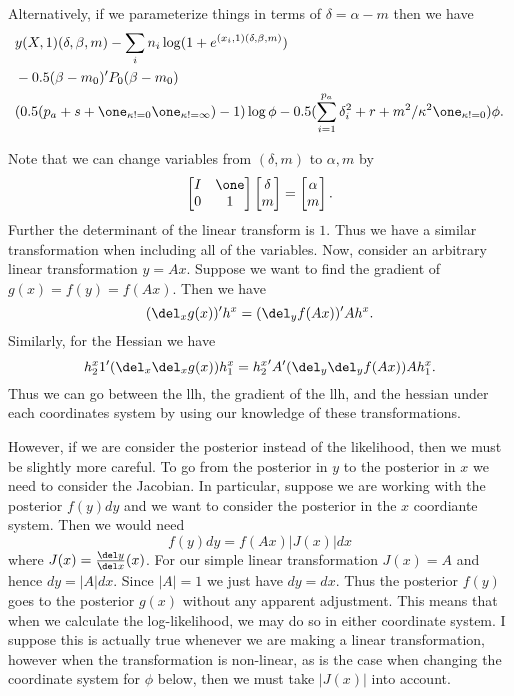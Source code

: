 \documentclass[]{article}
\begin{document}
Alternatively, if we parameterize things in terms of $\delta = \alpha - m$ then
we have
\begin{align*}
& y (X,1) (\delta, \beta, m) - \sum_i n_i \log (1 + e^{(x_i,1) (\delta, \beta, m)}) \\
& - 0.5 (\beta - m_0)' P_0 (\beta - m_0) \\
& (0.5 (p_a + s + \one_{\kappa != 0} \one_{\kappa != \infty}) - 1) \log \phi - 0.5 (\sum_{i=1}^{p_a}
\delta_i^2 + r + m^2 / \kappa^2 \one_{\kappa != 0}) \phi.
\end{align*}

Note that we can change variables from $(\delta, m)$ to $\alpha, m$ by
\[
\begin{bmatrix}
I & \one \\
0 & 1
\end{bmatrix}
\begin{bmatrix}
\delta \\ m
\end{bmatrix}
= 
\begin{bmatrix}
\alpha \\ m
\end{bmatrix}.
\]
Further the determinant of the linear transform is $1$.  Thus we have a similar
transformation when including all of the variables.  Now, consider an arbitrary
linear transformation $y = A x$.  Suppose we want to find the gradient of $g(x)
= f(y) = f(A x)$.  Then we have
\[
(\del_x g(x))' h^{x} = (\del_y f(Ax))' A h^{x}.
\]
Similarly, for the Hessian we have
\[
{h^x_2}1' (\del_x \del_x g(x)) h^x_1 = {h^{x}_2}' A' (\del_y \del_y f(Ax)) A h^{x}_1.
\]
Thus we can go between the llh, the gradient of the llh, and the hessian under
each coordinates system by using our knowledge of these transformations.

However, if we are consider the posterior instead of the likelihood, then we
must be slightly more careful.  To go from the posterior in $y$ to the posterior
in $x$ we need to consider the Jacobian.  In particular, suppose we are working
with the posterior $f(y) dy$ and we want to consider the posterior in the $x$
coordiante system.  Then we would need 
\[
f(y) dy = f(Ax) |J(x)| dx
\]
where $J(x) = \frac{\del y}{\del x}(x)$.  For our simple linear transformation
$J(x) = A$ and hence $dy = |A| dx$.  Since $|A|=1$ we just have $dy = dx$.  Thus
the posterior $f(y)$ goes to the posterior $g(x)$ without any apparent
adjustment.  This means that when we calculate the log-likelihood, we may do so
in either coordinate system.  I suppose this is actually true whenever we are
making a linear transformation, however when the transformation is non-linear,
as is the case when changing the coordinate system for $\phi$ below, then we
must take $|J(x)|$ into account.
\end{document}
